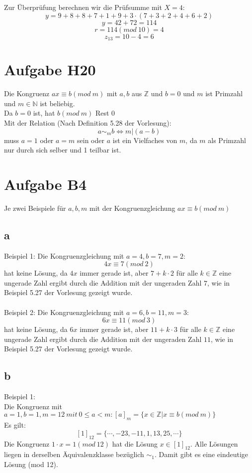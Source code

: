 \documentclass[11pt,a4paper]{article}
\begin{document}
Zur Überprüfung berechnen wir die Prüfsumme mit $X=4$:\\
\[y = 9+8+8+7+1+9 + 3 \cdot (7+3+2+4+6+2)\]
\[y = 42 + 72 = 114\]
\[r = 114(mod~10) = 4\]
\[z_{13} = 10-4 = 6\]

\section*{Aufgabe H20}
Die Kongruenz $ax \equiv b(mod~m)$ mit $a,b$ aus $ \mathbb{Z}$ und $b=0$ und $m$ ist Primzahl und $m \in \mathbb{N}$ ist beliebig.\\
Da $b=0$ ist, hat $b(mod~m)$ Rest $0$\\
Mit der Relation (Nach Definition 5.28 der Vorlesung):\\
\[a \sim_m b \Longleftrightarrow m|(a-b)\]
muss $a=1$ oder $a=m$ sein oder $a$ ist ein Vielfaches von $m$, da $m$ als Primzahl nur durch sich selber und 1 teilbar ist.\\

\section*{Aufgabe B4}
Je zwei Beispiele für $a,b,m$ mit der Kongruenzgleichung $ax \equiv b(mod~m)$

\subsection*{a}
Beispiel 1: Die Kongruenzgleichung mit $a=4, b=7, m=2$:\\
\[4x \equiv 7 (mod~2)\]
hat keine Lösung, da $4x$ immer gerade ist, aber $7 + k \cdot 2$ für alle $k \in \mathbb{Z}$ eine ungerade Zahl ergibt durch die Addition mit der ungeraden Zahl $7$, wie in Beispiel 5.27 der Vorlesung gezeigt wurde.\\
\\
Beispiel 2: Die Kongruenzgleichung mit $a=6, b=11, m=3$:\\
\[6x \equiv 11 (mod~3)\]
hat keine Lösung, da $6x$ immer gerade ist, aber $11 + k \cdot 3$ für alle $k \in \mathbb{Z}$ eine ungerade Zahl ergibt durch die Addition mit der ungeraden Zahl $11$, wie in Beispiel 5.27 der Vorlesung gezeigt wurde.\\

\subsection*{b}
Beispiel 1:\\
Die Kongruenz mit $a=1, b=1, m=12 ~mit~ 0\leq a < m: [a]_m = \{x \in \mathbb{Z}| x\equiv b(mod~m)\}$\\
Es gilt:\\
\[[1]_{12} = \{\cdots, -23, -11,1, 13, 25,\cdots \}\]
Die Kongruenz  $1\cdot x=1(mod~12)$ hat die Lösung $x \in [1]_{12}.$ Alle Lösungen liegen in derselben Äquivalenzklasse bezüglich $\sim_1$. Damit gibt es eine eindeutige Lösung (mod 12).\\
\end{document}
